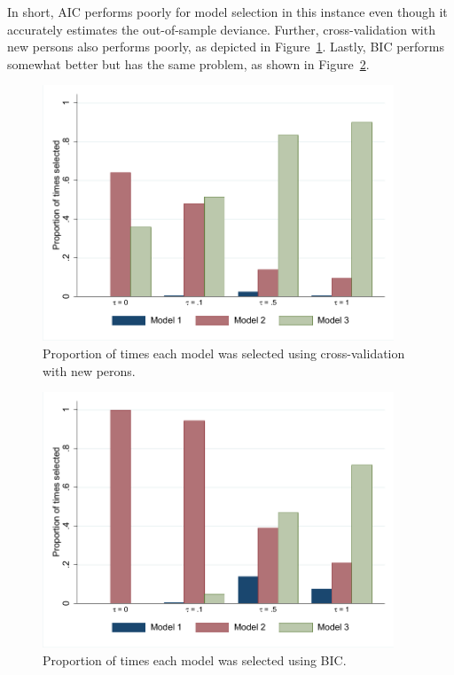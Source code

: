 \documentclass[12pt, letterpaper]{article}
\begin{document}
In short, AIC performs poorly for model selection in this instance even though it accurately estimates the out-of-sample deviance. Further, cross-validation with new persons also performs poorly, as depicted in Figure~\ref{fig:select-new-persons}. Lastly, BIC performs somewhat better but has the same problem, as shown in Figure~\ref{fig:select-bic}.

\begin{figure}[tbp]
	\centering
	\includegraphics[height=3in, trim = 1mm 1mm 1mm 1mm, clip=true]
	{chapter_2/figs/select_newpersons.pdf}
	\caption{Proportion of times each model was selected using cross-validation with new perons.}
	\label{fig:select-new-persons}
\end{figure}

\begin{figure}[tbp]
	\centering
	\includegraphics[height=3in, trim = 1mm 1mm 1mm 1mm, clip=true]
	{chapter_2/figs/select_bic.pdf}
	\caption{Proportion of times each model was selected using BIC.}
	\label{fig:select-bic}
\end{figure}
\end{document}
